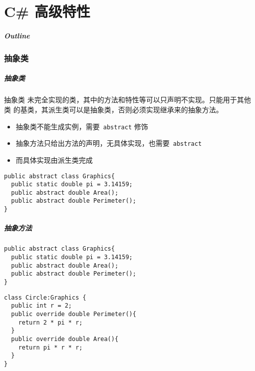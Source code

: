 
\part{C\# 高级特性}
\begin{frame}
\frametitle{Outline}            %
\tableofcontents
\end{frame}

\section{抽象类}

\begin{frame}[fragile]
\frametitle{抽象类}
\begin{block}{抽象类}
  \CJKindent 未完全实现的类，其中的方法和特性等可以只声明不实现。只能用于其他类
  的基类，其派生类可以是抽象类，否则必须实现继承来的抽象方法。
\end{block}
\pause
\begin{itemize}
\item 抽象类不能生成实例，需要~\texttt{abstract} 修饰
\item 抽象方法只给出方法的声明，无具体实现，也需要~\texttt{abstract}
\item 而具体实现由派生类完成
\end{itemize}
\begin{lstlisting}
public abstract class Graphics{
  public static double pi = 3.14159;
  public abstract double Area();
  public abstract double Perimeter();
}
\end{lstlisting}
\end{frame}

\begin{frame}[fragile]
\frametitle{抽象方法}
\begin{lstlisting}
public abstract class Graphics{
  public static double pi = 3.14159;
  public abstract double Area();
  public abstract double Perimeter();
}
\end{lstlisting}
\begin{lstlisting}
class Circle:Graphics {
  public int r = 2;
  public override double Perimeter(){
    return 2 * pi * r;
  }
  public override double Area(){
    return pi * r * r;
  }
}
\end{lstlisting}
\end{frame}

